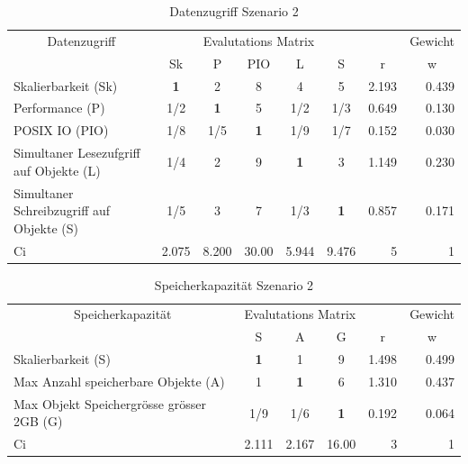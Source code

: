 \begin{table}[htbp]
\caption{Datenzugriff Szenario 2}
\begin{tabular}{|p{4.5cm}|c|c|c|c|c|r|r|}
\hline
\multicolumn{ 1}{|c|}{Datenzugriff} & \multicolumn{ 5}{c|}{Evalutations Matrix} & \multicolumn{1}{l|}{} & \multicolumn{1}{l|}{Gewicht} \\ \cline{ 2- 8}
\multicolumn{ 1}{|c|}{} & Sk & P & PIO  & L & S & \multicolumn{1}{c|}{r} & \multicolumn{1}{c|}{w} \\ \hline
Skalierbarkeit (Sk) & \textbf{1} & 2 & 8 & 4 & 5 & 2.193 & 0.439 \\ \hline
Performance (P) &  1/2 & \textbf{1} & 5 &  1/2 &  1/3 & 0.649 & 0.130 \\ \hline
POSIX IO (PIO) &  1/8 &  1/5 & \textbf{1} &  1/9 &  1/7 & 0.152 & 0.030 \\ \hline
Simultaner Lesezufgriff 
auf Objekte (L) &  1/4 & 2 & 9 & \textbf{1} & 3 & 1.149 & 0.230 \\ \hline
Simultaner Schreibzugriff
 auf Objekte (S) &  1/5 & 3 & 7 &  1/3 & \textbf{1} & 0.857 & 0.171 \\ \hline \hline
Ci & \multicolumn{1}{r|}{2.075} & \multicolumn{1}{r|}{8.200} & \multicolumn{1}{r|}{30.00} & \multicolumn{1}{r|}{5.944} & \multicolumn{1}{r|}{9.476} & 5 & 1 \\ \hline
\end{tabular}
\label{AHPDatenzugriffS2}
\end{table}

\begin{table}[htbp]
\caption{Speicherkapazität Szenario 2}
\begin{tabular}{|p{7.1cm}|c|c|c|r|r|}
\hline
\multicolumn{ 1}{|c|}{Speicherkapazität } & \multicolumn{ 3}{c|}{Evalutations Matrix} & \multicolumn{1}{l|}{} & \multicolumn{1}{l|}{Gewicht} \\ \cline{ 2- 6}
\multicolumn{ 1}{|c|}{} & S & A & G & \multicolumn{1}{c|}{r} & \multicolumn{1}{c|}{w} \\ \hline
Skalierbarkeit (S) & \textbf{1} & 1 & 9 & 1.498 & 0.499 \\ \hline
Max Anzahl speicherbare Objekte (A) & 1 & \textbf{1} & 6 & 1.310 & 0.437 \\ \hline
Max Objekt Speichergrösse grösser 2GB (G) &  1/9 &  1/6 & \textbf{1} & 0.192 & 0.064 \\ \hline \hline
Ci & \multicolumn{1}{r|}{2.111} & \multicolumn{1}{r|}{2.167} & \multicolumn{1}{r|}{16.00} & 3 & 1 \\ \hline
\end{tabular}
\label{AHPSpeicherkapazitätS2}
\end{table}


